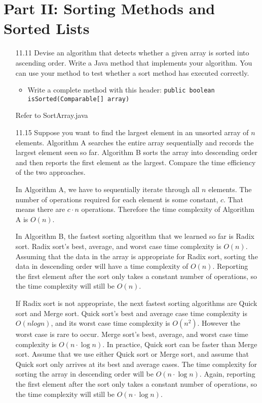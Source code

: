 \documentclass[10pt]{article}
\begin{document}
	\section{Part II: Sorting Methods and Sorted Lists}
		\begin{enumerate}
			\item[11.11] Devise an algorithm that detects whether a given array is sorted into ascending order. Write a Java method that implements your algorithm. You can use your method to test whether a sort method has executed correctly.
				\begin{itemize}
					\item Write a complete method with this header: \texttt{public boolean isSorted(Comparable[] array)}
				\end{itemize}
				
				\vspace{0.5cm}
				Refer to SortArray.java
				\vspace{0.5cm}
			
			\item[11.15] Suppose you want to find the largest element in an unsorted array of $n$ elements. Algorithm A searches the entire array sequentially and records the largest element seen so far. Algorithm B sorts the array into descending order and then reports the first element as the largest. Compare the time efficiency of the two approaches.
				
				\vspace{0.5cm}
				In Algorithm A, we have to sequentially iterate through all $n$ elements. The number of operations required for each element is some constant, $c$. That means there are $c \cdot n$ operations. Therefore the time complexity of Algorithm A is $O(n)$.
				
				\vspace{0.5cm}
				In Algorithm B, the fastest sorting algorithm that we learned so far is Radix sort. Radix sort's best, average, and worst case time complexity is $O(n)$. Assuming that the data in the array is appropriate for Radix sort, sorting the data in descending order will have a time complexity of $O(n)$. Reporting the first element after the sort only takes a constant number of operations, so the time complexity will still be $O(n)$.
				
				\vspace{0.5cm}
				If Radix sort is not appropriate, the next fastest sorting algorithms are Quick sort and Merge sort. Quick sort's best and average case time complexity is $O(n log n)$, and its worst case time complexity is $O(n^2)$. However the worst case is rare to occur. Merge sort's best, average, and worst case time complexity is $O(n \cdot \log n)$. In practice, Quick sort can be faster than Merge sort. Assume that we use either Quick sort or Merge sort, and assume that Quick sort only arrives at its best and average cases. The time complexity for sorting the array in descending order will be $O(n \cdot \log n)$. Again, reporting the first element after the sort only takes a constant number of operations, so the time complexity will still be $O(n \cdot \log n)$.
				

\end{enumerate}
\end{document}
